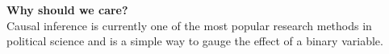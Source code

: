 \documentclass[aspectratio=169]{beamer}
\theoremstyle{principle}
\begin{document}
%

\begin{frame}

\begin{center}
\Huge\textbf{Why should we care?}\\
\bigskip
\bigskip
\large Causal inference is currently one of the most popular research methods in political science and is a simple way to gauge the effect of a binary variable.\\
\end{center}

\end{frame}
\end{document}
